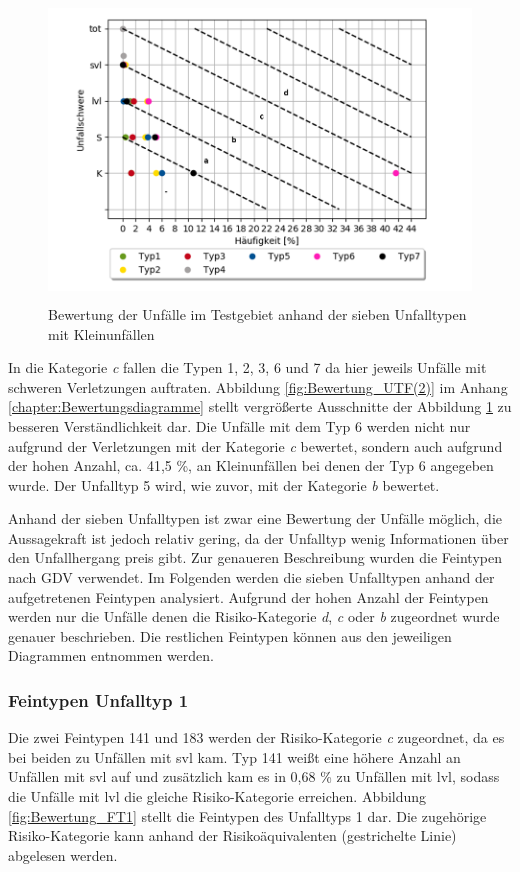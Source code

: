 \begin{savenotes}
	\begin{figure}[H]
		\centering
		\includegraphics[width=12cm,height=8cm]{figures/Bewertung_UTF}
		\caption[Bewertung der Unfälle im Testgebiet anhand der sieben Unfalltypen mit Kleinunfällen]{Bewertung der Unfälle im Testgebiet anhand der sieben Unfalltypen mit Kleinunfällen}\label{fig:Bewertung_UTF}
	\end{figure}
\end{savenotes}

In die Kategorie \textit{c} fallen die Typen 1, 2, 3, 6 und 7 da hier jeweils Unfälle mit schweren Verletzungen auftraten. Abbildung \ref{fig:Bewertung_UTF(2)} im Anhang \ref{chapter:Bewertungsdiagramme} stellt vergrößerte Ausschnitte der Abbildung \ref{fig:Bewertung_UTF} zu besseren Verständlichkeit dar. Die Unfälle mit dem Typ 6 werden nicht nur aufgrund der Verletzungen mit der Kategorie \textit{c} bewertet, sondern auch aufgrund der hohen Anzahl, ca. 41,5 \%, an Kleinunfällen bei denen der Typ 6 angegeben wurde. Der Unfalltyp 5 wird, wie zuvor, mit der Kategorie \textit{b} bewertet.

Anhand der sieben Unfalltypen ist zwar eine Bewertung der Unfälle möglich, die Aussagekraft ist jedoch relativ gering, da der Unfalltyp wenig Informationen über den Unfallhergang preis gibt. Zur genaueren Beschreibung wurden die Feintypen nach GDV verwendet. Im Folgenden werden die sieben Unfalltypen anhand der aufgetretenen Feintypen analysiert. Aufgrund der hohen Anzahl der Feintypen werden nur die Unfälle denen die Risiko-Kategorie \textit{d}, \textit{c} oder \textit{b} zugeordnet wurde genauer beschrieben. Die restlichen Feintypen können aus den jeweiligen Diagrammen entnommen werden.

\subsubsection{Feintypen Unfalltyp 1}
Die zwei Feintypen 141 und 183 werden der Risiko-Kategorie \textit{c} zugeordnet, da es bei beiden zu Unfällen mit \ac{svl} kam. Typ 141 weißt eine höhere Anzahl an Unfällen mit \ac{svl} auf und zusätzlich kam es in 0,68 \% zu Unfällen mit \ac{lvl}, sodass die Unfälle mit \ac{lvl} die gleiche Risiko-Kategorie erreichen. Abbildung \ref{fig:Bewertung_FT1} stellt die Feintypen des Unfalltyps 1 dar. Die zugehörige Risiko-Kategorie kann anhand der Risikoäquivalenten (gestrichelte Linie) abgelesen werden.

